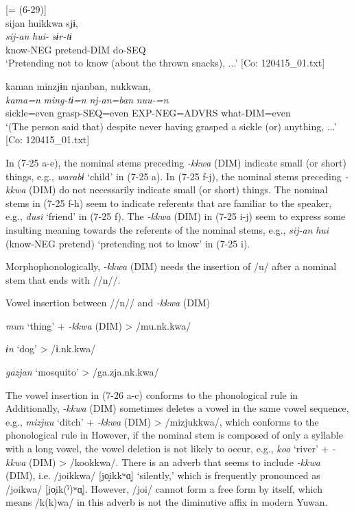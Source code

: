 \ex \label{ex:7:25i}  [= (6-29)]\\

\glll  sijan  huikkwa  sjɨ,\\
\textit{sij-an}  \textit{hui-}  \textit{sɨr-tɨ}\\
know-NEG  pretend-DIM  do-SEQ\\
\glt ‘Pretending not to know (about the thrown snacks), ...’ [Co: 120415\_01.txt]

\ex \label{ex:7:25j}
\glll  kaman  minzjɨn  njanban,  nukkwan,\footnotemark\\
\textit{kama=n}  \textit{ming-tɨ=n}  \textit{nj-an=ban}  \textit{nuu-=n}\\
sickle=even  grasp-SEQ=even  EXP-NEG=ADVRS  what-DIM=even\\
\glt ‘(The person said that) despite never having grasped a sickle (or) anything, ...’ [Co: 120415\_01.txt]
\z
\z

In (7-25 a-e), the nominal stems preceding \textit{{}-kkwa} (DIM) indicate small (or short) things, e.g., \textit{warabɨ} ‘child’ in (7-25 a). In (7-25 f-j), the nominal stems preceding \textit{{}-kkwa} (DIM) do not necessarily indicate small (or short) things. The nominal stems in (7-25 f-h) seem to indicate referents that are familiar to the speaker, e.g., \textit{dusi} ‘friend’ in (7-25 f). The \textit{{}-kkwa} (DIM) in (7-25 i-j) seem to express some insulting meaning towards the referents of the nominal stems, e.g., \textit{sij-an} \textit{hui} (know-NEG pretend) ‘pretending not to know’ in (7-25 i).

  Morphophonologically, \textit{{}-kkwa} (DIM) needs the insertion of /u/ after a nominal stem that ends with //n//.

\ea \label{ex:7:26}  Vowel insertion between //n// and \textit{{}-kkwa} (DIM)

  \ex  \textit{mun}  ‘thing’  +  \textit{{}-kkwa} (DIM)  >  /mu.nk.kwa/

  \ex  \textit{ɨn}  ‘dog’      >  /ɨ.nk.kwa/

  \ex  \textit{gazjan}  ‘mosquito’      >  /ga.zja.nk.kwa/
\z
\z

The vowel insertion in (7-26 a-c) conforms to the phonological rule in  Additionally, \textit{{}-kkwa} (DIM) sometimes deletes a vowel in the same vowel sequence, e.g., \textit{mizjuu} ‘ditch’ + \textit{{}-kkwa} (DIM) > /mizjukkwa/, which conforms to the phonological rule in  However, if the nominal stem is composed of only a syllable with a long vowel, the vowel deletion is not likely to occur, e.g., \textit{koo} ‘river’ + \textit{{}-kkwa} (DIM) > /kookkwa/. There is an adverb that seems to include \textit{{}-kkwa} (DIM), i.e. /joikkwa/ [jo̞ikkʷɑ̞] ‘silently,’ which is frequently pronounced as /joikwa/ [jo̞ik(ˀ)ʷɑ̞]. However, /joi/ cannot form a free form by itself, which means /k(k)wa/ in this adverb is not the diminutive affix in modern Yuwan.


